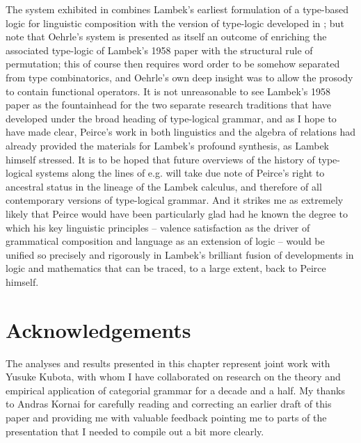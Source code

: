 \documentclass[output=paper,colorlinks,citecolor=brown]{langscibook}
\begin{document}
The system exhibited in  combines Lambek's earliest formulation
of a type-based logic for linguistic composition with the version of
type-logic developed in \citet{oehrle1994}; but note that Oehrle's system is
presented as itself an outcome of enriching the associated type-logic
of Lambek's 1958 paper with the structural rule of permutation; this
of course then requires word order to be somehow separated from type
combinatorics, and Oehrle's own deep insight was to allow the prosody
to contain functional operators. It is not unreasonable to see
Lambek's 1958 paper as the fountainhead for the two separate research
traditions that have developed under the broad heading of type-logical
grammar, and as I hope to have made clear, Peirce's work in both
linguistics and the algebra of relations had already provided the
materials for Lambek's profound synthesis, as Lambek himself stressed.
It is to be hoped that future overviews of the history of type-logical
systems along the lines of e.g. \citet{moortgat2010} will take due note of Peirce's right to
ancestral status in the lineage of the Lambek calculus, and therefore
of all contemporary versions of type-logical grammar. And it strikes
me as extremely likely that Peirce would have been
particularly glad had he known the degree to which his key
linguistic principles -- valence satisfaction as the driver of
grammatical composition and language as an extension of logic -- would
be unified so precisely and rigorously in Lambek's brilliant fusion
of developments in logic and mathematics that can be traced, to a large
extent, back to Peirce himself.




\section*{Acknowledgements}
The analyses and results
presented in this chapter represent joint work with Yusuke Kubota, with whom I
have collaborated on research on the theory and empirical application of
categorial grammar for a decade and a half. My thanks to Andras Kornai
for carefully reading and correcting an earlier draft of this paper
and providing me with valuable feedback pointing me to parts of
the presentation that I needed to compile out a bit more clearly.

{\sloppy\printbibliography[heading=subbibliography,notkeyword=this]}
\end{document}

